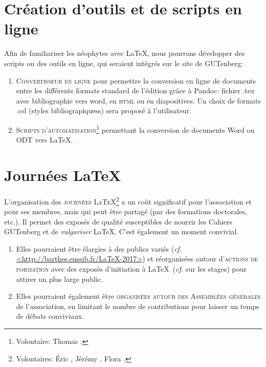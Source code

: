 \documentclass{tufte-handout}
\newcommand{\ratio}[3][]{\marginpar{\footnotesize{\textcolor{teal}{Temps requis: #2 / Utilité: #3}\par\noindent \textcolor{teal}{#1}}}}
\begin{document}
\section{Création d'outils et de scripts en ligne}

Afin de familiariser les néophytes avec \LaTeX\ratio[Petites contributions, par les connaisseurs]{++}{+++}, nous pourrons développer des scripts ou des outils en ligne, qui seraient intégrés sur le site de GUTenberg:

\begin{enumerate}
	\item\textsc{Convertisseur en ligne} pour permettre la conversion en ligne de documents entre les différents formats standard de l'édition grâce à Pandoc: fichier .tex avec bibliographie vers word, en \textsc{html} ou en diapositives. Un choix de formats .csl (styles bibliograpiquess) sera  proposé à l'utilisateur.
	\item\textsc{Scripts d'automatisation}\footnote{Volontaire: Thomas .} permettant la conversion de documents Word ou ODT vers \LaTeX.
\end{enumerate}


\section{Journées \LaTeX}

L'organisation des \textsc{journées \LaTeX}\ratio[Coûteuses, mais utiles et susceptibles de s'intégrer dans les autres projets]{+++}{+++}\footnote{Volontaires: Éric , Jérémy , Flora .} a un coût significatif pour l'association et pour ses membres, mais qui peut être partagé (par des formations doctorales, etc.). Il permet des exposés de qualité susceptibles de nourrir les Cahiers GUTenberg et de \emph{vulgariser} \LaTeX. C'est également un moment convivial.

\begin{enumerate}
	\item Elles pourraient être élargies à des publics variés (\emph{cf.} \url{<http://barthes.enssib.fr/LaTeX-2017>}) et réorganisées autour d'\textsc{actions de formation} avec des exposés d'initiation à \LaTeX\ (\emph{cf.} sur les stages) pour attirer un plus large public.
	\item Elles pourraient également être \textsc{organisées autour des Assemblées générales} de l'association, en limitant le nombre de contributions pour laisser un temps de débats conviviaux.
\end{enumerate}
\end{document}
